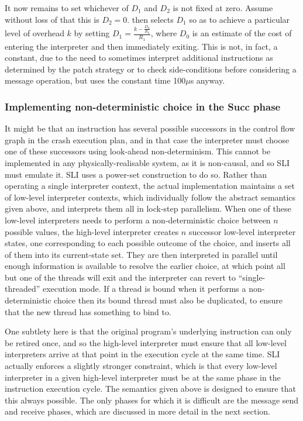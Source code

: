 
It now remains to set whichever of $D_1$ and $D_2$ is not fixed at
zero.  Assume without loss of that this is $D_2 = 0$.
{\Implementation} then selects $D_1$ so as to achieve a particular
level of overhead $k$ by setting $D_1 = \frac{k -
  \frac{D_0}{R_2}}{R_1}$, where $D_0$ is an estimate of the cost of
entering the interpreter and then immediately exiting.  This is not,
in fact, a constant, due to the need to sometimes interpret additional
instructions as determined by the patch strategy or to check
side-conditions before considering a message operation, but
{\implementation} uses the constant time 100$\mu$s anyway.

\subsubsection{Implementing non-deterministic choice in the Succ phase}

It might be that an instruction has several possible successors in the
control flow graph in the crash execution plan, and in that case the
interpreter must choose one of these successors using look-ahead
non-determinism.  This cannot be implemented in any
physically-realisable system, as it is non-causal, and so SLI must
emulate it.  SLI uses a power-set construction to do so.  Rather than
operating a single interpreter context, the actual implementation
maintains a set of low-level interpreter contexts, which individually
follow the abstract semantics given above, and interprets them all in
lock-step parallelism.  When one of these low-level interpreters needs
to perform a non-deterministic choice between $n$ possible values, the
high-level interpreter creates $n$ successor low-level interpreter
states, one corresponding to each possible outcome of the choice, and
inserts all of them into its current-state set.  They are then
interpreted in parallel until enough information is available to
resolve the earlier choice, at which point all but one of the threads
will exit and the interpreter can revert to ``single-threaded''
execution mode.  If a thread is bound when it performs a
non-deterministic choice then its bound thread must also be
duplicated, to ensure that the new thread has something to bind to.

One subtlety here is that the original program's underlying
instruction can only be retired once, and so the high-level
interpreter must ensure that all low-level interpreters arrive at that
point in the execution cycle at the same time.  SLI actually enforces
a slightly stronger constraint, which is that every low-level
interpreter in a given high-level interpreter must be at the same
phase in the instruction execution cycle.  The semantics given above
is designed to ensure that this always possible.  The only phases for
which it is difficult are the message send and receive phases, which
are discussed in more detail in the next section.

